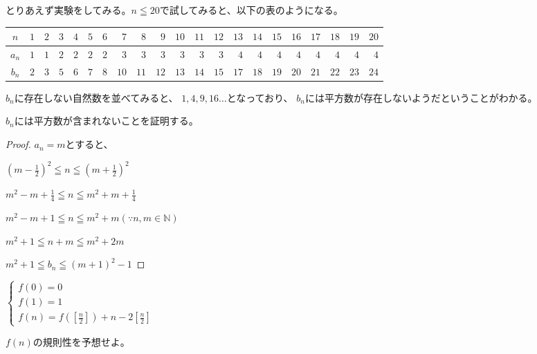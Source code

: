 \documentclass[uplatex,dvipdfmx]{jsbook}
\begin{document}
\begin{answer}
    とりあえず実験をしてみる。$n\leqq 20$で試してみると、以下の表のようになる。

    \begin{center}
        \begin{tabular}{|c||r|r|r|r|r|r|r|r|r|r|r|r|r|r|r|r|r|r|r|r|}
            \hline
            $n$ & $1$ & $2$ & $3$ & $4$ & $5$ & $6$ & $7$ & $8$ & $9$ & $10$ & $11$ & $12$ & $13$ & $14$ & $15$ & $16$ & $17$ & $18$ & $19$ & $20$\\\hline
            $a_n$ & $1$ & $1$ & $2$ & $2$ & $2$ & $2$ & $3$ & $3$ & $3$ & $3$ & $3$ & $3$ & $4$ & $4$ & $4$ & $4$ & $4$ & $4$ & $4$ & $4$\\\hline
            $b_n$ & $2$ & $3$ & $5$ & $6$ & $7$ & $8$ & $10$ & $11$ & $12$ & $13$ & $14$ & $15$ & $17$ & $18$ & $19$ & $20$ & $21$ & $22$ & $23$ & $24$\\\hline
        \end{tabular}
    \end{center}

    $b_n$に存在しない自然数を並べてみると、
    $1,4,9,16\dots$となっており、
    $b_n$には平方数が存在しないようだということがわかる。

    $b_n$には平方数が含まれないことを証明する。

    \begin{proof}
        $a_n=m$とすると、

        $\displaystyle \left(m-\frac{1}{2}\right) ^2\leqq n\leqq \left(m+\frac{1}{2}\right) ^2$

        $\displaystyle m^2-m+\frac{1}{4}\leqq n \leqq m^2+m+\frac{1}{4}$

        $\displaystyle m^2-m+1\leqq n \leqq m^2+m \left(\because n,m \in \mathbb{N}\right)$

        $m^2+1\leqq n+m \leqq m^2+2m$

        $m^2+1\leqq b_n \leqq \left(m+1\right)^2-1$

    \end{proof}

\end{answer}

\begin{problem}[練習問題2]
    \begin{math}
        \begin{cases}
            f\left(0\right)=0\\
            f\left(1\right)=1\\
            \displaystyle f\left(n\right)=f\left(\left[\frac{n}{2}\right]\right)+n-2\left[\frac{n}{2}\right]
        \end{cases}
    \end{math}

    $f\left(n\right)$の規則性を予想せよ。
\end{problem}
\end{document}
